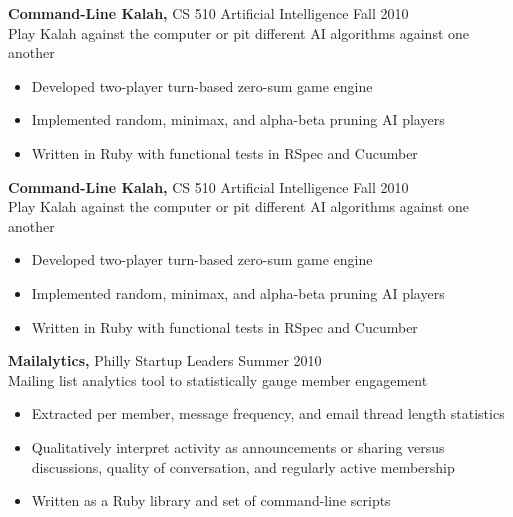 \documentclass[margin]{res}
\begin{document}
\begin{resume}
\begin{software}
{\bf Command-Line Kalah,} CS 510 Artificial Intelligence \hfill  Fall 2010 \\
Play Kalah against the computer or pit different AI algorithms against one another
\begin{itemize} \itemsep -2pt %
\item Developed two-player turn-based zero-sum game engine
\item Implemented random, minimax, and alpha-beta pruning AI players 
\item Written in Ruby with functional tests in RSpec and Cucumber
\end{itemize}
\end{software}
\begin{controls}
{\bf Command-Line Kalah,} CS 510 Artificial Intelligence \hfill  Fall 2010 \\
Play Kalah against the computer or pit different AI algorithms against one another
\begin{itemize} \itemsep -2pt %
\item Developed two-player turn-based zero-sum game engine
\item Implemented random, minimax, and alpha-beta pruning AI players 
\item Written in Ruby with functional tests in RSpec and Cucumber
\end{itemize}
\end{controls}

\begin{software}
{\bf Mailalytics,} Philly Startup Leaders \hfill  Summer 2010 \\
Mailing list analytics tool to statistically gauge member engagement
\begin{itemize} \itemsep -2pt %
\item Extracted per member, message frequency, and email thread length statistics
\item Qualitatively interpret activity as announcements or sharing versus discussions, quality of conversation, and regularly active membership
\item Written as a Ruby library and set of command-line scripts
\end{itemize}
\end{software}


\end{resume}
\end{document}
